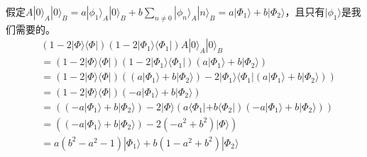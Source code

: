 假定$A|0\rangle _A |0\rangle _B = a|\phi _1\rangle _A |0\rangle _B+b\sum _{n\neq 0}|\phi _n\rangle _A |n\rangle _B=a|\Phi _1\rangle+b|\Phi _2\rangle$，且只有$|\phi _1\rangle$是我们需要的。
\begin{equation}
\begin{split}
&\left(1-2|\Phi\rangle \langle \Phi|\right)\left(1-2|\Phi_1\rangle \langle \Phi_1|\right)A|0\rangle _A |0\rangle _B\\
&=\left(1-2|\Phi\rangle \langle \Phi|\right)\left(1-2|\Phi_1\rangle \langle \Phi_1|\right)\left(a|\Phi _1\rangle+b|\Phi _2\rangle\right)\\
&=\left(1-2|\Phi\rangle \langle \Phi|\right)\left(\left(a|\Phi _1\rangle+b|\Phi _2\rangle\right)-2|\Phi_1\rangle \langle \Phi_1|\left(a|\Phi _1\rangle+b|\Phi _2\rangle\right)\right)\\
&=\left(1-2|\Phi\rangle \langle \Phi|\right)\left(-a|\Phi _1\rangle+b|\Phi _2\rangle \right)\\
&=\left(\left(-a|\Phi _1\rangle+b|\Phi _2\rangle \right)-2|\Phi\rangle \left(a\langle \Phi _1|+b\langle \Phi _2| \right)\left(-a|\Phi _1\rangle+b|\Phi _2\rangle \right)\right)\\
&=\left(\left(-a|\Phi _1\rangle+b|\Phi _2\rangle \right)-2(-a^2+b^2)|\Phi\rangle \right)\\
&=a\left(b^2-a^2-1\right)|\Phi _1\rangle+b\left(1-a^2+b^2\right)|\Phi _2\rangle\\
\end{split}
\end{equation}